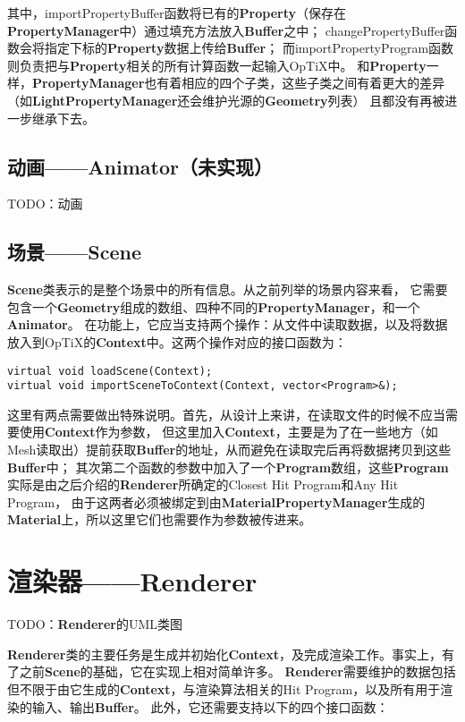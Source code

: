其中，importPropertyBuffer函数将已有的\textbf{Property}（保存在\textbf{PropertyManager}中）通过填充方法放入\textbf{Buffer}之中；
changePropertyBuffer函数会将指定下标的\textbf{Property}数据上传给\textbf{Buffer}；
而importPropertyProgram函数则负责把与\textbf{Property}相关的所有计算函数一起输入OpTiX中。
和\textbf{Property}一样，\textbf{PropertyManager}也有着相应的四个子类，这些子类之间有着更大的差异（如\textbf{LightPropertyManager}还会维护光源的\textbf{Geometry}列表）
且都没有再被进一步继承下去。

\subsection{动画——Animator（未实现）}
TODO：动画

\subsection{场景——Scene}
\textbf{Scene}类表示的是整个场景中的所有信息。从之前列举的场景内容来看，
它需要包含一个\textbf{Geometry}组成的数组、四种不同的\textbf{PropertyManager}，和一个\textbf{Animator}。
在功能上，它应当支持两个操作：从文件中读取数据，以及将数据放入到OpTiX的\textbf{Context}中。这两个操作对应的接口函数为：
\lstset{language=C++}
\begin{lstlisting}
virtual void loadScene(Context);
virtual void importSceneToContext(Context, vector<Program>&);
\end{lstlisting}

这里有两点需要做出特殊说明。首先，从设计上来讲，在读取文件的时候不应当需要使用\textbf{Context}作为参数，
但这里加入\textbf{Context}，主要是为了在一些地方（如Mesh读取出）提前获取\textbf{Buffer}的地址，从而避免在读取完后再将数据拷贝到这些\textbf{Buffer}中；
其次第二个函数的参数中加入了一个\textbf{Program}数组，这些\textbf{Program}实际是由之后介绍的\textbf{Renderer}所确定的Closest Hit Program和Any Hit Program，
由于这两者必须被绑定到由\textbf{MaterialPropertyManager}生成的\textbf{Material}上，所以这里它们也需要作为参数被传进来。

\section{渲染器——Renderer}
TODO：\textbf{Renderer}的UML类图

\textbf{Renderer}类的主要任务是生成并初始化\textbf{Context}，及完成渲染工作。事实上，有了之前\textbf{Scene}的基础，它在实现上相对简单许多。
\textbf{Renderer}需要维护的数据包括但不限于由它生成的\textbf{Context}，与渲染算法相关的Hit Program，以及所有用于渲染的输入、输出\textbf{Buffer}。
此外，它还需要支持以下的四个接口函数：

